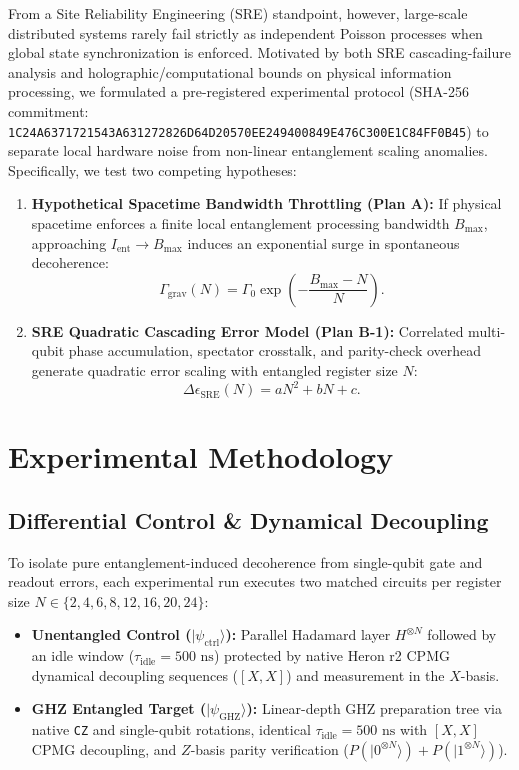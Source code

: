 \documentclass[11pt,a4paper,twocolumn]{article}
\begin{document}
From a Site Reliability Engineering (SRE) standpoint, however, large-scale distributed systems rarely fail strictly as independent Poisson processes when global state synchronization is enforced. Motivated by both SRE cascading-failure analysis and holographic/computational bounds on physical information processing, we formulated a pre-registered experimental protocol (SHA-256 commitment: \texttt{1C24A6371721543A631272826D64D20570EE249400849E476C300E1C84FF0B45}) to separate local hardware noise from non-linear entanglement scaling anomalies. Specifically, we test two competing hypotheses:
\begin{enumerate}
    \item \textbf{Hypothetical Spacetime Bandwidth Throttling (Plan A):} If physical spacetime enforces a finite local entanglement processing bandwidth $B_{\max}$, approaching $I_{\text{ent}} \to B_{\max}$ induces an exponential surge in spontaneous decoherence:
    \begin{equation}
        \Gamma_{\text{grav}}(N) = \Gamma_0 \exp\!\left(-\frac{B_{\max} - N}{N}\right).
        \label{eq:throttling}
    \end{equation}
    \item \textbf{SRE Quadratic Cascading Error Model (Plan B-1):} Correlated multi-qubit phase accumulation, spectator crosstalk, and parity-check overhead generate quadratic error scaling with entangled register size $N$:
    \begin{equation}
        \Delta\epsilon_{\text{SRE}}(N) = a N^2 + b N + c.
        \label{eq:quadratic}
    \end{equation}
\end{enumerate}

\section{Experimental Methodology}

\subsection{Differential Control \& Dynamical Decoupling}
To isolate pure entanglement-induced decoherence from single-qubit gate and readout errors, each experimental run executes two matched circuits per register size $N \in \{2, 4, 6, 8, 12, 16, 20, 24\}$:
\begin{itemize}
    \item \textbf{Unentangled Control ($|\psi_{\text{ctrl}}\rangle$):} Parallel Hadamard layer $H^{\otimes N}$ followed by an idle window ($\tau_{\text{idle}} = 500\text{ ns}$) protected by native Heron r2 CPMG dynamical decoupling sequences ($[X, X]$) and measurement in the $X$-basis.
    \item \textbf{GHZ Entangled Target ($|\psi_{\text{GHZ}}\rangle$):} Linear-depth GHZ preparation tree via native \texttt{CZ} and single-qubit rotations, identical $\tau_{\text{idle}} = 500\text{ ns}$ with $[X, X]$ CPMG decoupling, and $Z$-basis parity verification ($P(|0^{\otimes N}\rangle) + P(|1^{\otimes N}\rangle)$).
\end{itemize}
\end{document}
